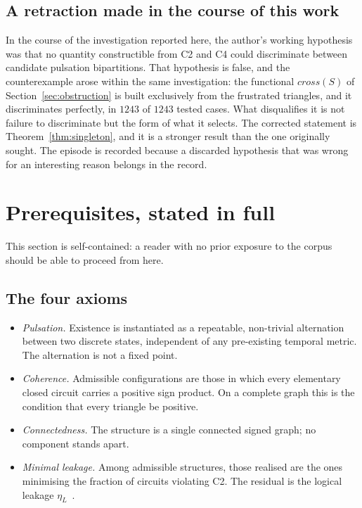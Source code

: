\documentclass[11pt,a4paper]{article}
\def\mathrm#1{#1}%
\newcommand{\cross}{\mathrm{cross}}
\newcommand{\etaL}{\eta_L}
\begin{document}
\subsection{A retraction made in the course of this work}

In the course of the investigation reported here, the author's working hypothesis was that no quantity constructible from C2 and C4 could discriminate between candidate pulsation bipartitions. That hypothesis is false, and the counterexample arose within the same investigation: the functional $\cross(S)$ of Section~\ref{sec:obstruction} is built exclusively from the frustrated triangles, and it discriminates perfectly, in $1243$ of $1243$ tested cases. What disqualifies it is not failure to discriminate but the form of what it selects. The corrected statement is Theorem~\ref{thm:singleton}, and it is a stronger result than the one originally sought. The episode is recorded because a discarded hypothesis that was wrong for an interesting reason belongs in the record.

\section{Prerequisites, stated in full}
\label{sec:prereq}

This section is self-contained: a reader with no prior exposure to the corpus should be able to proceed from here.

\subsection{The four axioms}

\begin{itemize}
\item[\textbf{C1}] \emph{Pulsation.} Existence is instantiated as a repeatable, non-trivial alternation between two discrete states, independent of any pre-existing temporal metric. The alternation is not a fixed point.
\item[\textbf{C2}] \emph{Coherence.} Admissible configurations are those in which every elementary closed circuit carries a positive sign product. On a complete graph this is the condition that every triangle be positive.
\item[\textbf{C3}] \emph{Connectedness.} The structure is a single connected signed graph; no component stands apart.
\item[\textbf{C4}] \emph{Minimal leakage.} Among admissible structures, those realised are the ones minimising the fraction of circuits violating C2. The residual is the logical leakage $\etaL$~\citep{D08}.
\end{itemize}
\end{document}
